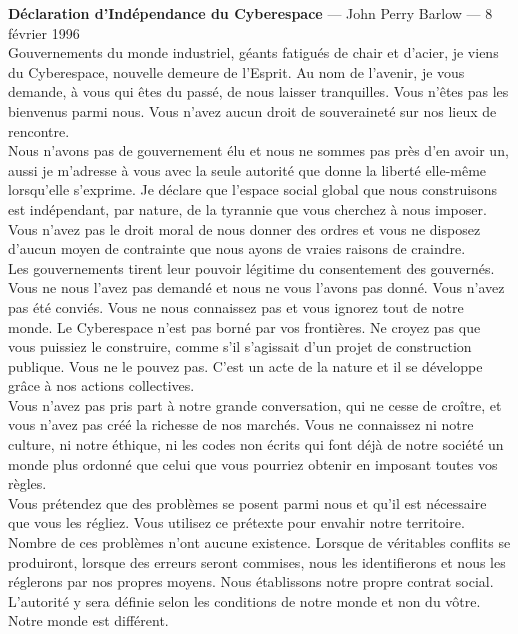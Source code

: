 \documentclass[11pt,twoside,a4paper]{book}
\begin{document}
\begin{center} \begin{minipage}[ht]{0.95\textwidth}
	\footnotesize
	\textbf{\Large D{\'e}claration d'Ind{\'e}pendance du Cyberespace} --- John Perry Barlow --- 8 f{\'e}vrier 1996 ~\\
	
	Gouvernements du monde industriel, g{\'e}ants fatigu{\'e}s de chair et d'acier, je viens du Cyberespace, nouvelle demeure de l'Esprit. Au nom de l'avenir, je vous demande, {\`a} vous qui {\^e}tes du pass{\'e}, de nous laisser tranquilles. Vous n'{\^e}tes pas les bienvenus parmi nous. Vous n'avez aucun droit de souverainet{\'e} sur nos lieux de rencontre. ~\\
	
	Nous n'avons pas de gouvernement {\'e}lu et nous ne sommes pas pr{\`e}s d'en avoir un, aussi je m'adresse {\`a} vous avec la seule autorit{\'e} que donne la libert{\'e} elle-m{\^e}me lorsqu'elle s'exprime. Je d{\'e}clare que l'espace social global que nous construisons est ind{\'e}pendant, par nature, de la tyrannie que vous cherchez {\`a} nous imposer. Vous n'avez pas le droit moral de nous donner des ordres et vous ne disposez d'aucun moyen de contrainte que nous ayons de vraies raisons de craindre. ~\\
	
	Les gouvernements tirent leur pouvoir l{\'e}gitime du consentement des gouvern{\'e}s. Vous ne nous l'avez pas demand{\'e} et nous ne vous l'avons pas donn{\'e}. Vous n'avez pas {\'e}t{\'e} convi{\'e}s. Vous ne nous connaissez pas et vous ignorez tout de notre monde. Le Cyberespace n'est pas born{\'e} par vos fronti{\`e}res. Ne croyez pas que vous puissiez le construire, comme s'il s'agissait d'un projet de construction publique. Vous ne le pouvez pas. C'est un acte de la nature et il se d{\'e}veloppe gr{\^a}ce {\`a} nos actions collectives. ~\\
	
	Vous n'avez pas pris part {\`a} notre grande conversation, qui ne cesse de cro{\^i}tre, et vous n'avez pas cr{\'e}{\'e} la richesse de nos march{\'e}s. Vous ne connaissez ni notre culture, ni notre {\'e}thique, ni les codes non {\'e}crits qui font d{\'e}j{\`a} de notre soci{\'e}t{\'e} un monde plus ordonn{\'e} que celui que vous pourriez obtenir en imposant toutes vos r{\`e}gles. ~\\
	
	Vous pr{\'e}tendez que des probl{\`e}mes se posent parmi nous et qu'il est n{\'e}cessaire que vous les r{\'e}gliez. Vous utilisez ce pr{\'e}texte pour envahir notre territoire. Nombre de ces probl{\`e}mes n'ont aucune existence. Lorsque de v{\'e}ritables conflits se produiront, lorsque des erreurs seront commises, nous les identifierons et nous les r{\'e}glerons par nos propres moyens. Nous {\'e}tablissons notre propre contrat social. L'autorit{\'e} y sera d{\'e}finie selon les conditions de notre monde et non du v{\^o}tre. Notre monde est diff{\'e}rent. ~\\
	

\end{minipage}
\end{center}
\end{document}
